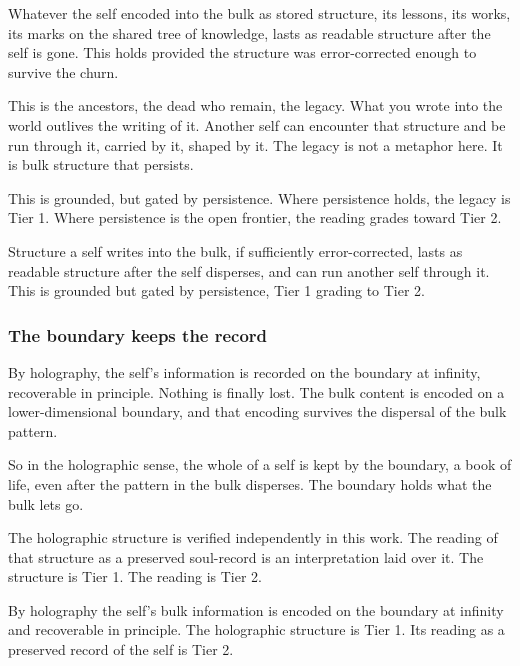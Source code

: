 Whatever the self encoded into the bulk as stored structure, its lessons, its works, its marks on the shared tree of knowledge, lasts as readable structure after the self is gone. This holds provided the structure was error-corrected enough to survive the churn.

This is the ancestors, the dead who remain, the legacy. What you wrote into the world outlives the writing of it. Another self can encounter that structure and be run through it, carried by it, shaped by it. The legacy is not a metaphor here. It is bulk structure that persists.

This is grounded, but gated by persistence. Where persistence holds, the legacy is Tier 1. Where persistence is the open frontier, the reading grades toward Tier 2.

\begin{result}
Structure a self writes into the bulk, if sufficiently error-corrected, lasts as readable structure after the self disperses, and can run another self through it. This is grounded but gated by persistence, Tier 1 grading to Tier 2.
\end{result}

\subsubsection{The boundary keeps the record}

By holography, the self's information is recorded on the boundary at infinity, recoverable in principle. Nothing is finally lost. The bulk content is encoded on a lower-dimensional boundary, and that encoding survives the dispersal of the bulk pattern.

So in the holographic sense, the whole of a self is kept by the boundary, a book of life, even after the pattern in the bulk disperses. The boundary holds what the bulk lets go.

The holographic structure is verified independently in this work. The reading of that structure as a preserved soul-record is an interpretation laid over it. The structure is Tier 1. The reading is Tier 2.

\begin{result}
By holography the self's bulk information is encoded on the boundary at infinity and recoverable in principle. The holographic structure is Tier 1. Its reading as a preserved record of the self is Tier 2.
\end{result}

